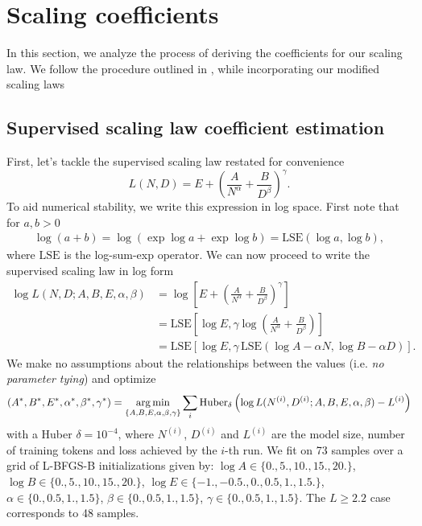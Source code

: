 \clearpage
\section{Scaling coefficients}
\label{sec:scaling-coefficients}

In this section, we analyze the process of deriving the coefficients for our scaling law. We follow the procedure outlined in \citep{DBLP:journals/corr/abs-2203-15556,DBLP:journals/corr/abs-2404-10102}, while incorporating our modified scaling laws

\subsection{Supervised scaling law coefficient estimation}
\label{ssec:supervised-scaling-law-coefficient-estimation}
First, let's tackle the supervised scaling law  restated for convenience
\begin{equation}
	L(N,D)=
	E
	+
	\left(\frac{A}{N^\alpha}+\frac{B}{D^\beta}\right)^\gamma.
\end{equation}
To aid numerical stability, we write this expression in log space.
First note that for $a,b>0$
\begin{align}
	\log(a+b)=\log\left(\exp\log a+ \exp\log b\right)=\mathrm{LSE}(\log a, \log b),
\end{align}
where $\mathrm{LSE}$ is the log-sum-exp operator.
We can now proceed to write the supervised scaling law in log form
\begin{align}
	\log L(N,D;A,B,E,\alpha,\beta)
	 & =
	\log \left[E
		+
	\left(\frac{A}{N^\alpha}+\frac{B}{D^\beta}\right)^\gamma\right]                                             \\
	 & =\mathrm{LSE}\left[\log E, \gamma\log
	\left(\frac{A}{N^\alpha}+\frac{B}{D^\beta}\right)\right]                                                    \\
	 & =\mathrm{LSE}\left[\log E, \gamma\,\mathrm{LSE}\left(\log A - \alpha N, \log B - \alpha D\right)\right].
\end{align}
We make no assumptions about the relationships between the values (i.e. \emph{no parameter tying})
and optimize
\begin{align}
	(A^*,B^*,E^*,\alpha^*,\beta^*,\gamma^*) = \operatorname*{arg\,min}_{\{A,B,E,\alpha,\beta,\gamma\}}\sum_i\mathrm{Huber}_\delta\left(\log L(N^{(i)},D^{(i)};A,B,E,\alpha,\beta)-L^{(i)}\right)
\end{align}
with a Huber $\delta=10^{-4}$,
where $N^{(i)}$, $D^{(i)}$ and $L^{(i)}$ are the model size, number of training tokens and loss achieved by the $i$-th run.
We fit on 73 samples over a grid of L-BFGS-B initializations given by:
$\log A\in\{0., 5., 10., 15., 20.\}$,
$\log B\in\{0., 5., 10., 15., 20.\}$,
$\log E \in\{-1., -0.5., 0., 0.5, 1., 1.5.\}$,
$\alpha\in\{0., 0.5, 1., 1.5\}$,
$\beta\in\{0., 0.5, 1., 1.5\}$,
$\gamma\in\{0., 0.5, 1., 1.5\}$.
The $L\geq 2.2$ case corresponds to 48 samples.

